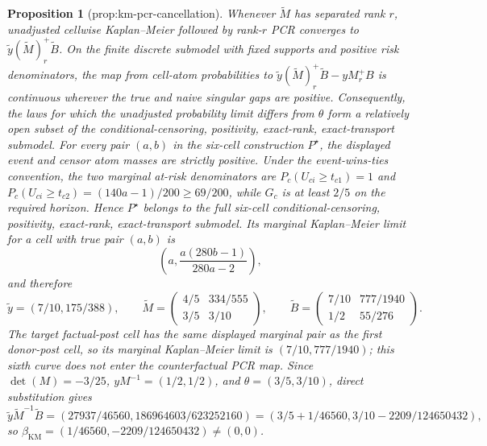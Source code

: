 \documentclass{article}
\newtheorem{proposition}{Proposition}
\begin{document}
\begin{proposition}[prop:km-pcr-cancellation]\label{prop:km-pcr-cancellation}
Whenever \(\widetilde M\) has separated rank \(r\), unadjusted cellwise Kaplan--Meier followed by rank-\(r\) PCR converges to \(\widetilde y(\widetilde M)_r^+\widetilde B\). On the finite discrete submodel with fixed supports and positive risk denominators, the map from cell-atom probabilities to \(\widetilde y(\widetilde M)_r^+\widetilde B-yM_r^+B\) is continuous wherever the true and naive singular gaps are positive. Consequently, the laws for which the unadjusted probability limit differs from \(\theta\) form a relatively open subset of the conditional-censoring, positivity, exact-rank, exact-transport submodel. For every pair \((a,b)\) in the six-cell construction \(P^\star\), the displayed event and censor atom masses are strictly positive. Under the event-wins-ties convention, the two marginal at-risk denominators are \(P_c(U_{ci}\ge t_{c1})=1\) and \(P_c(U_{ci}\ge t_{c2})=(140a-1)/200\ge69/200\), while \(G_c\) is at least \(2/5\) on the required horizon. Hence \(P^\star\) belongs to the full six-cell conditional-censoring, positivity, exact-rank, exact-transport submodel. Its marginal Kaplan--Meier limit for a cell with true pair \((a,b)\) is
\[
\left(a,\frac{a(280b-1)}{280a-2}\right),
\]
and therefore
\[
\widetilde y=(7/10,175/388),\qquad
\widetilde M=\begin{pmatrix}4/5&334/555\\3/5&3/10\end{pmatrix},\qquad
\widetilde B=\begin{pmatrix}7/10&777/1940\\1/2&55/276\end{pmatrix}.
\]
The target factual-post cell has the same displayed marginal pair as the first donor-post cell, so its marginal Kaplan--Meier limit is \((7/10,777/1940)\); this sixth curve does not enter the counterfactual PCR map. Since \(\det(M)=-3/25\), \(yM^{-1}=(1/2,1/2)\), and \(\theta=(3/5,3/10)\), direct substitution gives
\[
\widetilde y\widetilde M^{-1}\widetilde B
=\left(27937/46560,186964603/623252160\right)
=\left(3/5+1/46560,3/10-2209/124650432\right),
\]
so \(\beta_{\mathrm{KM}}=(1/46560,-2209/124650432)\ne(0,0)\).
\end{proposition}
\end{document}
